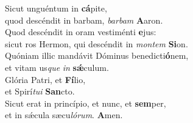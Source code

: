 \evenverse Sicut unguéntum in \textbf{cá}pite,~\*\\
\evenverse quod descéndit in barbam, \textit{bar}\textit{bam} \textbf{A}aron.\\
\oddverse Quod descéndit in oram vestiménti \textbf{e}jus:~\*\\
\oddverse sicut ros Hermon, qui descéndit in \textit{mon}\textit{tem} \textbf{Si}on.\\
\evenverse Quóniam illic mandávit Dóminus benedicti\textbf{ó}nem,~\*\\
\evenverse et vitam us\textit{que} \textit{in} \textbf{sǽ}culum.\\
\oddverse Glória Patri, et \textbf{Fí}lio,~\*\\
\oddverse et Spirí\textit{tu}\textit{i} \textbf{San}cto.\\
\evenverse Sicut erat in princípio, et nunc, et \textbf{sem}per,~\*\\
\evenverse et in sǽcula sæcu\textit{ló}\textit{rum}. \textbf{A}men.\\
